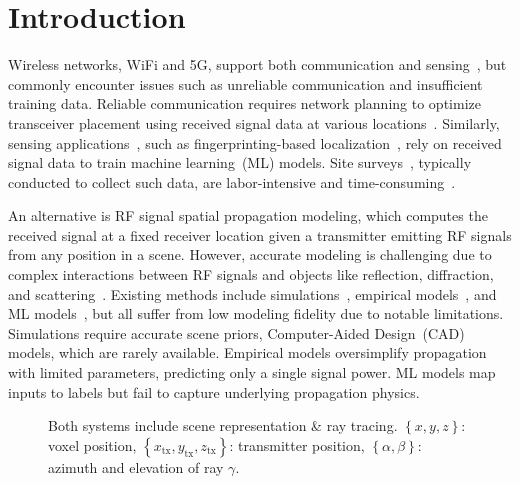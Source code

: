 

\section{Introduction}\label{sec_introduction}

Wireless networks, \eg WiFi and 5G, support both communication and sensing~\cite{ma2019wifi, abedi2020witag, okubo2024integrated}, but commonly encounter issues such as unreliable communication and insufficient training data. 
Reliable communication requires network planning to optimize transceiver placement using received signal data at various locations~\cite{zhu2021network, ahamed20215g, zelaya2021lava, krijestorac2021spatial}.  
Similarly, sensing applications~\cite{ding2024exploring, ding2024multi}, such as fingerprinting-based localization~\cite{ayyalasomayajula2020deep, lu2023millimeter, yang2024orchloc}, rely on received signal data to train machine learning~(ML) models.
Site surveys~\cite{kar2018site}, typically conducted to collect such data, are labor-intensive and time-consuming~\cite{site_survey_cisco}.


An alternative is RF signal spatial propagation modeling, which computes the received signal at a fixed receiver location given a transmitter emitting RF signals from any position in a scene.
However, accurate modeling is challenging due to complex interactions between RF signals and objects like reflection, diffraction, and scattering~\cite{1451581, na2022huygens, maxwell1873treatise}.
Existing methods include simulations~\cite{wirelessinsite_web, orekondy2022winert, RayTracingToolbox}, empirical models~\cite{rappaport1996wireless, parsons2012mobile, hata1980empirical}, and ML models~\cite{parralejo2021comparative, liu2021fire, malmirchegini2012spatial}, but all suffer from low modeling fidelity due to notable limitations. 
Simulations require accurate scene priors, \eg Computer-Aided Design~(CAD) models, which are rarely available.
Empirical models oversimplify propagation with limited parameters, predicting only a single signal power.
ML models map inputs to labels but fail to capture underlying propagation physics.



\begin{figure}[tp]
\centering
\caption{Both systems include scene representation \& ray tracing. $\left\{x, y, z\right\}$: voxel position, $\left\{x_{\text{tx}}, y_{\text{tx}}, z_{\text{tx}}\right\}$: transmitter position, $\left\{\alpha, \beta\right\}$: azimuth and elevation of ray $\gamma$.}
\Description[]{}
\end{figure}



